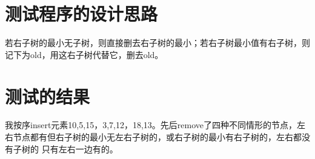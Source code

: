 \documentclass[UTF8]{ctexart}
\begin{document}
\pagestyle{fancy}
\fancyhead{}

\section{测试程序的设计思路}
若右子树的最小无子树，则直接删去右子树的最小；若右子树最小值有右子树，则记下为old，用这右子树代替它，删去old。

\section{测试的结果}

我按序insert元素10,5,15，3,7,12，18,13。先后remove了四种不同情形的节点，左右节点都有但右子树的最小无左右子树的，或右子树的最小有右子树的，左右都没有子树的
只有左右一边有的。
\end{document}
